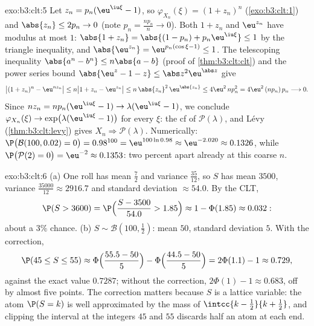 \begin{solution}{exo:b3:clt:5}
Let $z_n = p_n(\eu^{\iu\xi} - 1)$, so $\varphi_{X_n}(\xi) =
(1 + z_n)^n$ (\cref{exo:b3:clt:1}) and $\abs{z_n} \leq 2p_n
\to 0$ (note $p_n = \frac{np_n}n \to 0$). Both $1 + z_n$ and
$\eu^{z_n}$ have modulus at most $1$: $\abs{1 + z_n} =
\abs{(1 - p_n) + p_n\eu^{\iu\xi}} \leq 1$ by the triangle
inequality, and $\abs{\eu^{z_n}} = \eu^{p_n(\cos\xi - 1)}
\leq 1$. The telescoping inequality $\abs{a^n - b^n} \leq
n\abs{a - b}$ (proof of \cref{thm:b3:clt:clt}) and the power
series bound $\abs{\eu^z - 1 - z} \leq
\abs z^2\eu^{\abs z}$ give
\[
\bigl|(1 + z_n)^n - \eu^{nz_n}\bigr| \leq n\bigl|1 + z_n -
\eu^{z_n}\bigr| \leq n\,\abs{z_n}^2\,\eu^{\abs{z_n}} \leq
4\eu^2\,np_n^2 = 4\eu^2\,(np_n)\,p_n \longrightarrow 0 .
\]
Since $nz_n = np_n(\eu^{\iu\xi} - 1) \to
\lambda(\eu^{\iu\xi} - 1)$, we conclude $\varphi_{X_n}(\xi)
\to \exp\bigl(\lambda(\eu^{\iu\xi} - 1)\bigr)$ for every
$\xi$: the cf of $\mathcal P(\lambda)$, and L\'evy
(\cref{thm:b3:clt:levy}) gives $X_n \Rightarrow \mathcal
P(\lambda)$. Numerically: $\P\bigl(\mathcal B(100, 0.02) =
0\bigr) = 0.98^{100} = \eu^{100\ln 0.98} \approx
\eu^{-2.020} \approx 0.1326$, while $\P\bigl(\mathcal P(2) =
0\bigr) = \eu^{-2} \approx 0.1353$: two percent apart
already at this coarse $n$.
\end{solution}

\begin{solution}{exo:b3:clt:6}
(a) One roll has mean $\frac72$ and variance
$\frac{35}{12}$, so $S$ has mean $3500$, variance
$\frac{35000}{12} \approx 2916.7$ and standard deviation
$\approx 54.0$. By the CLT,
\[
\P(S > 3600) = \P\Bigl(\frac{S - 3500}{54.0} > 1.85\Bigr)
\approx 1 - \Phi(1.85) \approx 0.032 :
\]
about a $3\%$ chance.
(b) $S \sim \mathcal B(100, \frac12)$: mean $50$, standard
deviation $5$. With the  correction,
\[
\P(45 \leq S \leq 55) \approx
\Phi\Bigl(\frac{55.5 - 50}{5}\Bigr) -
\Phi\Bigl(\frac{44.5 - 50}{5}\Bigr) = 2\Phi(1.1) - 1
\approx 0.729,
\]
against the exact value $0.7287$; without the correction,
$2\Phi(1) - 1 \approx 0.683$, off by almost five points. The
correction matters because $S$ is a lattice variable: the
atom $\P(S = k)$ is well approximated by the  mass
of $\intcc{k - \frac12}{k + \frac12}$, and clipping the
interval at the integers $45$ and $55$ discards half an atom
at each end.
\end{solution}

